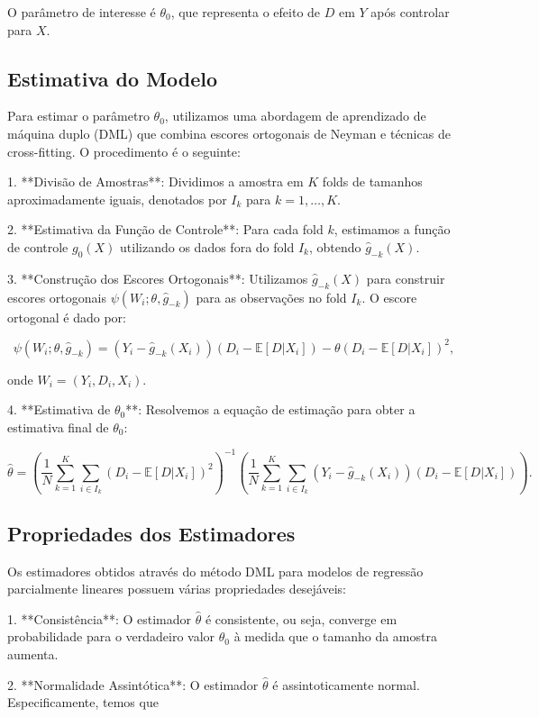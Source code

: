 \documentclass[a4paper,12pt]{article}[abntex2]
\begin{document}
O parâmetro de interesse é $\theta_0$, que representa o efeito de $D$ em $Y$ após controlar para $X$.

\subsection*{Estimativa do Modelo}

Para estimar o parâmetro $\theta_0$, utilizamos uma abordagem de aprendizado de máquina duplo (DML) que combina escores ortogonais de Neyman e técnicas de cross-fitting. O procedimento é o seguinte:

1. **Divisão de Amostras**: Dividimos a amostra em $K$ folds de tamanhos aproximadamente iguais, denotados por $I_k$ para $k = 1, \ldots, K$.

2. **Estimativa da Função de Controle**: Para cada fold $k$, estimamos a função de controle $g_0(X)$ utilizando os dados fora do fold $I_k$, obtendo $\hat{g}_{-k}(X)$.

3. **Construção dos Escores Ortogonais**: Utilizamos $\hat{g}_{-k}(X)$ para construir escores ortogonais $\psi(W_i; \theta, \hat{g}_{-k})$ para as observações no fold $I_k$. O escore ortogonal é dado por:

\[
\psi(W_i; \theta, \hat{g}_{-k}) = (Y_i - \hat{g}_{-k}(X_i))(D_i - \mathbb{E}[D | X_i]) - \theta (D_i - \mathbb{E}[D | X_i])^2,
\]

onde $W_i = (Y_i, D_i, X_i)$.

4. **Estimativa de $\theta_0$**: Resolvemos a equação de estimação para obter a estimativa final de $\theta_0$:

\[
\hat{\theta} = \left( \frac{1}{N} \sum_{k=1}^K \sum_{i \in I_k} (D_i - \mathbb{E}[D | X_i])^2 \right)^{-1} \left( \frac{1}{N} \sum_{k=1}^K \sum_{i \in I_k} (Y_i - \hat{g}_{-k}(X_i))(D_i - \mathbb{E}[D | X_i]) \right).
\]

\subsection*{Propriedades dos Estimadores}

Os estimadores obtidos através do método DML para modelos de regressão parcialmente lineares possuem várias propriedades desejáveis:

1. **Consistência**: O estimador $\hat{\theta}$ é consistente, ou seja, converge em probabilidade para o verdadeiro valor $\theta_0$ à medida que o tamanho da amostra aumenta.

2. **Normalidade Assintótica**: O estimador $\hat{\theta}$ é assintoticamente normal. Especificamente, temos que
\end{document}
